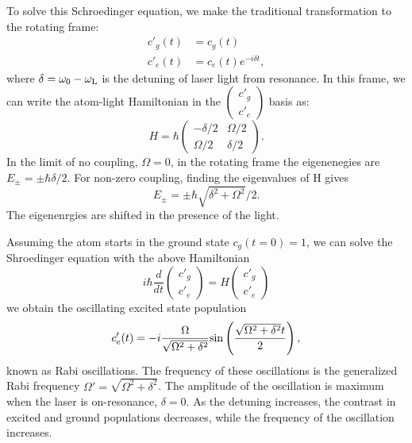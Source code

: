 To solve this Schroedinger equation, we make the traditional transformation to the rotating frame:
\begin{align}
c'_g(t) & = c_g(t)\\
c'_e(t) & = c_e(t) e^{-i\delta t}, 
\end{align}
where $\delta = \omega_0 - \omega_{\rm L}$ is the detuning of laser light from resonance. In this frame, we can write the atom-light Hamiltonian in the $\begin{pmatrix} c'_g \\ c'_e \end{pmatrix}$ basis as:
\begin{equation}
H = \hbar \begin{pmatrix} -\delta/2 & \Omega/2 \\ \Omega/2 & \delta/2 \end{pmatrix}.
\label{eqn:TwoLevelHam}
\end{equation}
In the limit of no coupling, $\Omega = 0$, in the rotating frame the eigenenegies are $E_{\pm} = \pm \hbar \delta/2$. For non-zero coupling, finding the eigenvalues of H gives 
\begin{equation}
E_{\pm} = \pm \hbar \sqrt{\delta^2 + \Omega^2}/2.
\label{eqn:TwoLevelEnergy}
\end{equation}
The eigenenrgies are shifted in the presence of the light. 

Assuming the atom starts in the ground state $c_g(t=0)=1$, we can solve the Shroedinger equation with the above Hamiltonian
\begin{equation}
i\hbar \frac{d}{dt} \begin{pmatrix} c'_g \\ c'_e \end{pmatrix} = H \begin{pmatrix} c'_g \\ c'_e \end{pmatrix}
\end{equation}
we obtain the oscillating excited state population 
\begin{equation}
c'_e(t) = -i \frac{\Omega}{\sqrt{\Omega^2 + \delta^2}}{\rm sin}\left(\frac{\sqrt{\Omega^2 + \delta^2}t}{2}\right),
\label{eq:Rabi}
\end{equation} 
known as Rabi oscillations. The frequency of these oscillations is the generalized Rabi frequency $\Omega'=\sqrt{\Omega^2 + \delta^2}$. The amplitude of the oscillation is maximum when the laser is on-resonance, $\delta=0$. As the detuning increases, the contrast in excited and ground populations decreases, while the frequency of the oscillation increases. 

